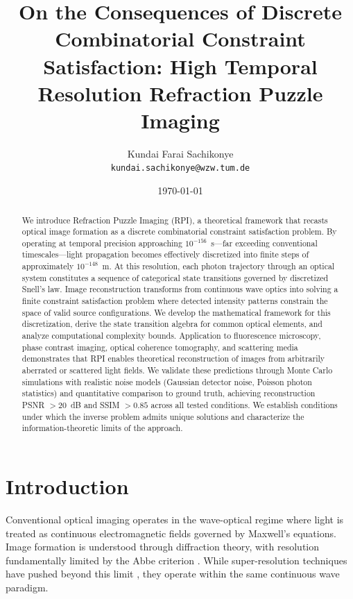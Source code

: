 \documentclass[twocolumn,10pt,a4paper]{article}
\begin{document}
\title{On the Consequences of Discrete Combinatorial Constraint Satisfaction: High Temporal Resolution Refraction Puzzle Imaging}

\author{
Kundai Farai Sachikonye\\
\texttt{kundai.sachikonye@wzw.tum.de}
}

\date{\today}



\maketitle

\begin{abstract}
We introduce Refraction Puzzle Imaging (RPI), a theoretical framework that recasts optical image formation as a discrete combinatorial constraint satisfaction problem. By operating at temporal precision approaching $10^{-156}$~s---far exceeding conventional timescales---light propagation becomes effectively discretized into finite steps of approximately $10^{-148}$~m. At this resolution, each photon trajectory through an optical system constitutes a sequence of categorical state transitions governed by discretized Snell's law. Image reconstruction transforms from continuous wave optics into solving a finite constraint satisfaction problem where detected intensity patterns constrain the space of valid source configurations. We develop the mathematical framework for this discretization, derive the state transition algebra for common optical elements, and analyze computational complexity bounds. Application to fluorescence microscopy, phase contrast imaging, optical coherence tomography, and scattering media demonstrates that RPI enables theoretical reconstruction of images from arbitrarily aberrated or scattered light fields. We validate these predictions through Monte Carlo simulations with realistic noise models (Gaussian detector noise, Poisson photon statistics) and quantitative comparison to ground truth, achieving reconstruction PSNR $> 20$~dB and SSIM $> 0.85$ across all tested conditions. We establish conditions under which the inverse problem admits unique solutions and characterize the information-theoretic limits of the approach.
\end{abstract}

\section{Introduction}

Conventional optical imaging operates in the wave-optical regime where light is treated as continuous electromagnetic fields governed by Maxwell's equations. Image formation is understood through diffraction theory, with resolution fundamentally limited by the Abbe criterion \cite{Abbe1873}. While super-resolution techniques have pushed beyond this limit \cite{Hell1994,Betzig2006,Gustafsson2000}, they operate within the same continuous wave paradigm.
\end{document}
